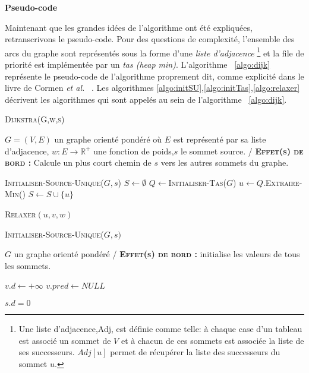 
\noindent \textbf{Pseudo-code}

Maintenant que les grandes idées de l'algorithme ont été expliquées, retranscrivons le pseudo-code. Pour des questions de complexité, l'ensemble des arcs du graphe sont représentés sous la forme d'une \textit{liste d'adjacence} \footnote{Une liste d'adjacence,Adj, est définie comme telle: à chaque case d'un tableau est associé un sommet de $V$ et à chacun de ces sommets est associée la liste de ses successeurs. $Adj[u]$ permet de récupérer la liste des successeurs du sommet $u$. } et la file de priorité est implémentée par un \textit{tas (heap min)}. L'algorithme ~\ref{algo:dijk} représente le pseudo-code de l'algorithme proprement dit, comme explicité dans le livre de Cormen \emph{et al.} ~\cite{Cormen:2009:IA:580470}. Les algorithmes \ref{algo:initSU},\ref{algo:initTas},\ref{algo:relaxer} décrivent les algorithmes qui sont appelés au sein de l'algorithme ~\ref{algo:dijk}.

\begin{algorithm}
	\caption{\textsc {Dijkstra(G,w,s)}}
	 \label{algo:dijk}
	\begin{algorithmic}[1]
		\REQUIRE $G = (V,E)$ un graphe orienté pondéré où $E$ est représenté par sa liste d'adjacence, $w: E \rightarrow \mathbb{R}^{+}$ une fonction de poids,$s$ le sommet source.
		\ENSURE / \textbf{\textsc{Effet(s) de bord :}} Calcule un plus court chemin de $s$ vers les autres sommets du graphe.
		
		\STATE \textsc{Initialiser-Source-Unique}($G,s$)
		\STATE $S \leftarrow \emptyset$
		\STATE $Q \leftarrow $\textsc{Initialiser-Tas}($G$)
			\STATE $u \leftarrow Q.$\textsc{Extraire-Min}()
			\STATE $S \leftarrow S \cup \{ u \} $
			
				\STATE \textsc{Relaxer}$(u,v,w)$
			\ENDFOR
		\ENDWHILE
	
			
\end{algorithmic}
		
\end{algorithm}


\begin{algorithm}
	\caption{\textsc {Initialiser-Source-Unique}($G,s)$}
	 \label{algo:initSU}
	\begin{algorithmic}[1]
		\REQUIRE $G$ un graphe orienté pondéré
		\ENSURE / \textbf{\textsc{Effet(s) de bord :}} initialise les valeurs de tous les sommets.
		
			\STATE $v.d \leftarrow +\infty$
			\STATE $v.pred \leftarrow NULL$
		\ENDFOR
		
		\STATE $s.d = 0$
	
			
\end{algorithmic}
		
\end{algorithm}

